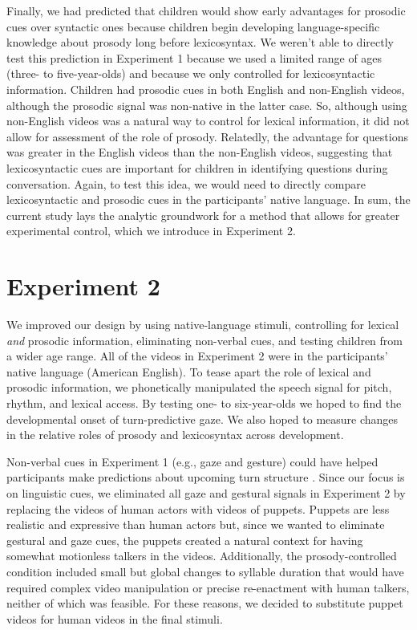 \documentclass[authoryear, 12pt]{elsarticle}
\begin{document}
Finally, we had predicted that children would show early advantages for prosodic cues over syntactic ones because children begin developing language-specific knowledge about prosody long before lexicosyntax. We weren't able to directly test this prediction in Experiment 1 because we used a limited range of ages (three- to five-year-olds) and because we only controlled for lexicosyntactic information. Children had prosodic cues in both English and non-English videos, although the prosodic signal was non-native in the latter case. So, although using non-English videos was a natural way to control for lexical information, it did not allow for assessment of the role of prosody. Relatedly, the advantage for questions was greater in the English videos than the non-English videos, suggesting that lexicosyntactic cues are important for children in identifying questions during conversation. Again, to test this idea, we would need to directly compare lexicosyntactic and prosodic cues in the participants' native language. In sum, the current study lays the analytic groundwork for a method that allows for greater experimental control, which we introduce in Experiment 2. 




\section{Experiment 2}
\label{sec:exp2}

We improved our design by using native-language stimuli, controlling for lexical \textit{and} prosodic information, eliminating non-verbal cues, and testing children from a wider age range. All of the videos in Experiment 2 were in the participants' native language (American English). To tease apart the role of lexical and prosodic information, we phonetically manipulated the speech signal for pitch, rhythm, and lexical access. By testing one- to six-year-olds we hoped to find the developmental onset of turn-predictive gaze. We also hoped to measure changes in the relative roles of prosody and lexicosyntax across development.

Non-verbal cues in Experiment 1 (e.g., gaze and gesture) could have helped participants make predictions about upcoming turn structure  \citep{rossano2009, stivers2010}. Since our focus is on linguistic cues, we eliminated all gaze and gestural signals in Experiment 2 by replacing the videos of human actors with videos of puppets. Puppets are less realistic and expressive than human actors but, since we wanted to eliminate gestural and gaze cues, the puppets created a natural context for having somewhat motionless talkers in the videos. Additionally, the prosody-controlled condition included small but global changes to syllable duration that would have required complex video manipulation or precise re-enactment with human talkers, neither of which was feasible. For these reasons, we decided to substitute puppet videos for human videos in the final stimuli. 
\end{document}
